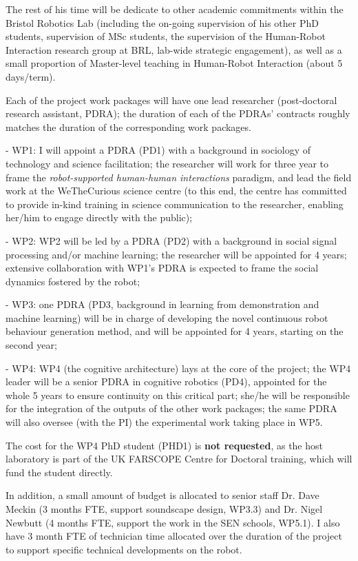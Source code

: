 The rest of his time will be dedicate to other academic commitments within the Bristol Robotics Lab 
(including the on-going supervision of his other PhD students, supervision of MSc students, the 
supervision of the Human-Robot Interaction research group at BRL, lab-wide strategic engagement), 
as well as a small proportion of Master-level teaching in Human-Robot Interaction (about 5 days/term).

Each of the project work packages will have one lead researcher (post-doctoral
research assistant, PDRA); the duration of each
 of the PDRAs' contracts roughly matches the duration of the corresponding work packages.

-   WP1: I will appoint a PDRA (PD1) with a background in sociology of
    technology and science facilitation; the researcher will work for three year to
    frame the \emph{robot-supported human-human interactions} paradigm, and lead the
    field work at the WeTheCurious science centre (to this end, the centre has
    committed to provide in-kind training in science communication to the
    researcher, enabling her/him to engage directly with the public);

-   WP2: WP2 will be led by a PDRA (PD2) with a background in social signal processing and/or machine 
    learning; the researcher will be appointed for 4 years; extensive collaboration with WP1's PDRA
    is expected to frame the social dynamics fostered by the robot;

-   WP3: one PDRA (PD3, background in learning from demonstration and machine learning) will be in charge 
    of developing the novel continuous robot behaviour generation method, and will be appointed for 4 years, 
    starting on the second year;

-   WP4: WP4 (the cognitive architecture) lays at the core of the project; the WP4 leader will be a senior 
    PDRA in cognitive robotics (PD4), appointed for the whole 5 years to ensure continuity on this critical part; 
    she/he will be responsible for the integration of the outputs of the other work packages; the same PDRA will
    also oversee (with the PI) the experimental work taking place in WP5.

The cost for the WP4 PhD student (PHD1) is \textbf{not requested}, as the host
laboratory is part of the UK FARSCOPE Centre for Doctoral training, which will
fund the student directly.

In addition, a small amount of budget is allocated to senior staff Dr. Dave
Meckin (3 months FTE, support soundscape design, WP3.3) and Dr. Nigel Newbutt (4
months FTE, support the work in the SEN schools, WP5.1). I also have 3 month FTE
of technician time allocated over the duration of the project to support
specific technical developments on the robot.

